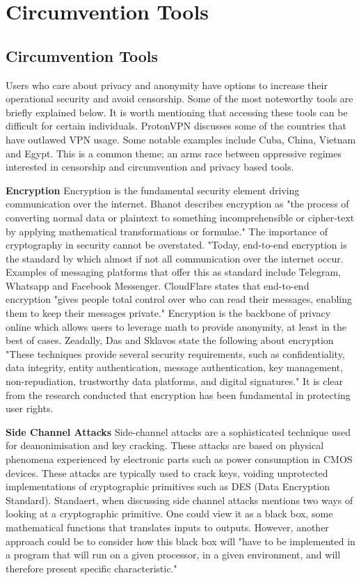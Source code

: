 \chapter{Circumvention Tools}
\section{Circumvention Tools}
Users who care about privacy and anonymity have options to increase their operational security and avoid censorship. Some of the most noteworthy tools are briefly explained below. It is worth mentioning that accessing these tools can be difficult for certain individuals. ProtonVPN discusses some of the countries that have outlawed VPN usage. \cite{protonvpn_vpn_legality_2} Some notable examples include Cuba, China, Vietnam and Egypt. This is a common theme; an arms race between oppressive regimes interested in censorship and circumvention and privacy based tools.

\textbf{Encryption}
Encryption is the fundamental security element driving communication over the internet. Bhanot describes encryption as "the process of converting normal data or plaintext to something incomprehensible or cipher-text by applying mathematical transformations or formulae." \cite{bhanot2015review} The importance of cryptography in security cannot be overstated. "Today, end-to-end encryption is the standard by which almost if not all communication over the internet occur. Examples of messaging platforms that offer this as standard include Telegram, Whatsapp and Facebook Messenger. CloudFlare states that end-to-end encryption "gives people total control over who can read their messages, enabling them to keep their messages private." \cite{cloudflare_e2ee} Encryption is the backbone of privacy online which allows users to leverage math to provide anonymity, at least in the best of cases. Zeadally, Das and Sklavos state the following about encryption "These techniques provide several security requirements, such as confidentiality, data integrity, entity authentication, message authentication, key management, non-repudiation, trustworthy data platforms, and digital signatures." \cite{ZEADALLY2021100075} It is clear from the research conducted that encryption has been fundamental in protecting user rights. 

\textbf{Side Channel Attacks}
 Side-channel attacks are a sophisticated technique used for deanonimisation and key cracking. These attacks are based on physical phenomena experienced by electronic parts such as power consumption in CMOS devices. These attacks are typically used to crack keys, voiding unprotected implementations of cryptographic primitives such as DES (Data Encryption Standard). Standaert, when discussing side channel attacks mentions two ways of looking at a cryptographic primitive. One could view it as a black box, some mathematical functions that translates inputs to outputs. However, another approach could be to consider how this black box will "have to be implemented in a program that will run on a given processor, in a given environment, and will therefore present specific characteristic." \cite{standaert2005introduction} 

